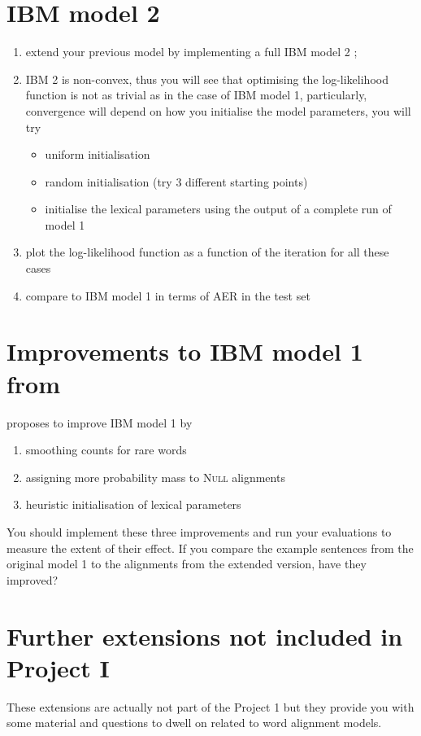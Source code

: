 \section{IBM model 2}

\begin{enumerate}
  \item extend your previous model by implementing a full IBM model 2 \citep{Brown+1993:smt};
  \item IBM 2 is non-convex, thus you will see that optimising the log-likelihood function is 
        not as trivial as in the case of IBM model 1, particularly, convergence will depend 
        on how you initialise the model parameters, you will try
  \begin{itemize}
    \item uniform initialisation
    \item random initialisation (try 3 different starting points)
    \item initialise the lexical parameters using the output of a complete run of model 1
  \end{itemize}
  \item plot the log-likelihood function as a function of the iteration for all these cases
  \item compare to IBM model 1 in terms of AER in the test set
\end{enumerate}


\section{Improvements to IBM model 1 from \cite{Moore:2004:IBM1}}

\citet{Moore:2004:IBM1} proposes to improve IBM model 1 by
\begin{enumerate} 
  \item smoothing counts for rare words
  \item assigning more probability mass to \textsc{Null} alignments
  \item heuristic initialisation of lexical parameters
\end{enumerate}

You should implement these three improvements and run your evaluations
to measure the extent of their effect.
If you compare the example sentences from the original model 1 to the
alignments from the extended version, have they improved?
%
%
\section{Further extensions not included in Project I}
These extensions are actually not part of the Project 1 but they provide you with
some material and questions to dwell on related to word alignment models.

